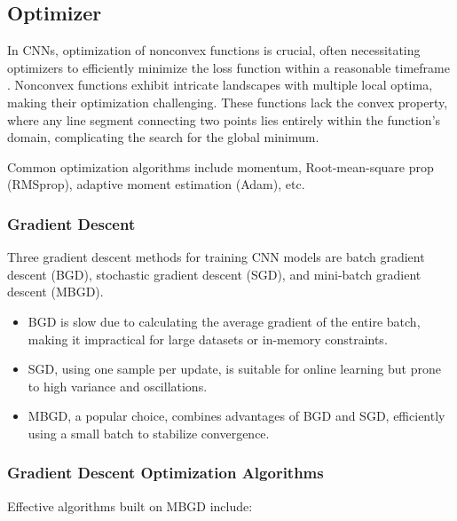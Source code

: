 \subsection{Optimizer}
\label{subsection:optimizer}

In CNNs, optimization of nonconvex functions is crucial, often necessitating optimizers to efficiently minimize the loss function within a reasonable timeframe \cite{Li:2021}. Nonconvex functions exhibit intricate landscapes with multiple local optima, making their optimization challenging. These functions lack the convex property, where any line segment connecting two points lies entirely within the function's domain, complicating the search for the global minimum.

Common optimization algorithms include momentum, Root-mean-square prop (RMSprop), adaptive moment estimation (Adam), etc.

\subsubsection{Gradient Descent}

Three gradient descent methods for training CNN models are batch gradient descent (BGD), stochastic gradient descent (SGD), and mini-batch gradient descent (MBGD).

\begin{itemize}
	\item BGD is slow due to calculating the average gradient of the entire batch, making it impractical for large datasets or in-memory constraints.
	\item SGD, using one sample per update, is suitable for online learning but prone to high variance and oscillations.
	\item MBGD, a popular choice, combines advantages of BGD and SGD, efficiently using a small batch to stabilize convergence.
\end{itemize}

\subsubsection{Gradient Descent Optimization Algorithms}

Effective algorithms built on MBGD include:

